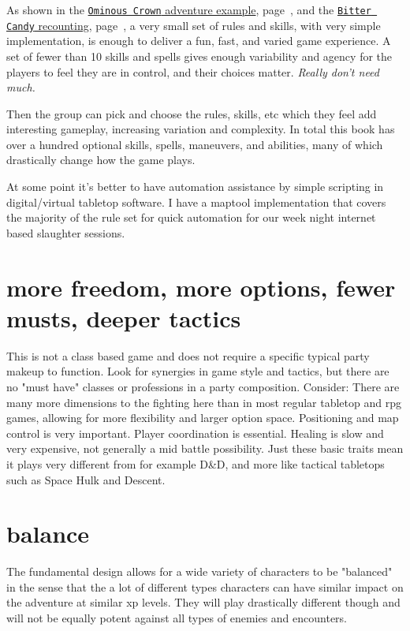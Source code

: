 As shown in the 
\hyperref[sec:basicenough]{\texttt{Ominous Crown} adventure example}, page~\pageref{sec:basicenough}, and the 
\hyperref[sec:youngkids]{\texttt{Bitter Candy} recounting}, page~\pageref{sec:youngkids}, 
a very small set of rules and skills, with very simple implementation, is enough to deliver a fun, fast, and varied game experience. A set of fewer than 10 skills and spells gives enough variability and agency for the players to feel they are in control, and their choices matter. \emph{Really don't need much.}

Then the group can pick and choose the rules, skills, etc which they feel add interesting gameplay, increasing variation and complexity. In total this book has over a hundred optional skills, spells, maneuvers, and abilities, many of which drastically change how the game plays.

At some point it's better to have automation assistance by simple scripting in digital/virtual tabletop software. I have a maptool implementation that covers the majority of the rule set for quick automation for our week night internet based slaughter sessions.


\section*{more freedom, more options, fewer musts, deeper tactics}
This is not a class based game and does not require a specific typical party makeup to function. Look for synergies in game style and tactics, but there are no "must have" classes or professions in a party composition. Consider: There are many more dimensions to the fighting here than in most regular tabletop and rpg games, allowing for more flexibility and larger option space. Positioning and map control is very important. Player coordination is essential. Healing is slow and very expensive, not generally a mid battle possibility. Just these basic traits mean it plays very different from for example D\&D, and more like tactical tabletops such as Space Hulk and Descent.


\section*{balance}
The fundamental design allows for a wide variety of characters to be "balanced" in the sense that the a lot of different types characters can have similar impact on the adventure at similar xp levels. They will play drastically different though and will not be equally potent against all types of enemies and encounters.

